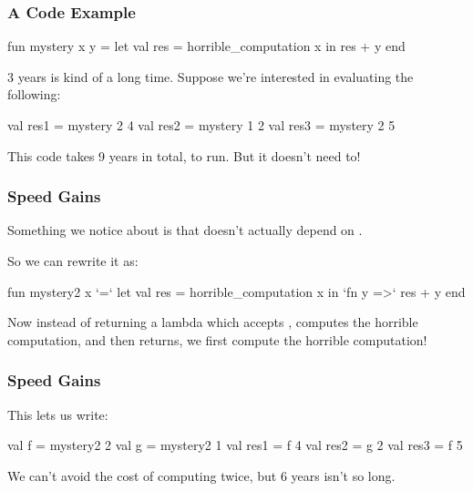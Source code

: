 \documentclass[aspectratio=169, handout]{beamer}
\begin{document}
\begin{frame}[fragile]
  \frametitle{A Code Example}

  \begin{codeblock}
    fun mystery x y =
      let
        val res = horrible_computation x
      in
        res + y
      end
  \end{codeblock}

  \pause
  \vspace{\fill}

  3 years is kind of a long time. Suppose we're interested in evaluating the following:

  \begin{codeblock}
    val res1 = mystery 2 4
    val res2 = mystery 1 2
    val res3 = mystery 2 5
  \end{codeblock}

  \pause
  \vspace{\fill}

  This code takes 9 years in total, to run. But it doesn't need to!
\end{frame}

\begin{frame}[fragile]
  \frametitle{Speed Gains}

  Something we notice about  is that
   doesn't actually depend on .

  \pause
  \vspace{\fill}

  So we can rewrite it as:
  \begin{codeblock}
    fun mystery2 x `=`
      let
        val res = horrible_computation x
      in
        `fn y =>` res + y
      end
  \end{codeblock}

  \pause
  \vspace{\fill}

  Now instead of returning a lambda which accepts , computes the horrible
  computation, and then returns, we first compute the horrible computation!
\end{frame}

\begin{frame}[fragile]
  \frametitle{Speed Gains}

  This lets us write:

  \pause
  \begin{codeblock}
    val f = mystery2 2
    val g = mystery2 1
    val res1 = f 4
    val res2 = g 2
    val res3 = f 5
  \end{codeblock}

  \pause
  \vspace{\fill}

  We can't avoid the cost of computing  twice, but 6 years isn't so long.
\end{frame}
\end{document}
